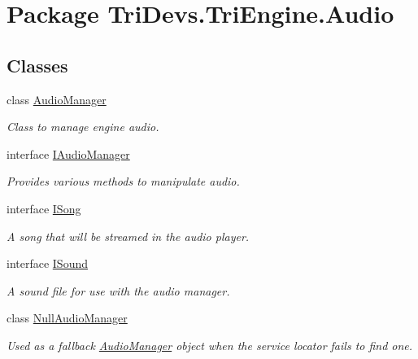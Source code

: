 \hypertarget{namespace_tri_devs_1_1_tri_engine_1_1_audio}{\section{Package Tri\-Devs.\-Tri\-Engine.\-Audio}
\label{namespace_tri_devs_1_1_tri_engine_1_1_audio}
}
\subsection*{Classes}
\begin{DoxyCompactItemize}
\item 
class \hyperlink{class_tri_devs_1_1_tri_engine_1_1_audio_1_1_audio_manager}{Audio\-Manager}
\begin{DoxyCompactList}\small\item\em Class to manage engine audio. \end{DoxyCompactList}\item 
interface \hyperlink{interface_tri_devs_1_1_tri_engine_1_1_audio_1_1_i_audio_manager}{I\-Audio\-Manager}
\begin{DoxyCompactList}\small\item\em Provides various methods to manipulate audio. \end{DoxyCompactList}\item 
interface \hyperlink{interface_tri_devs_1_1_tri_engine_1_1_audio_1_1_i_song}{I\-Song}
\begin{DoxyCompactList}\small\item\em A song that will be streamed in the audio player. \end{DoxyCompactList}\item 
interface \hyperlink{interface_tri_devs_1_1_tri_engine_1_1_audio_1_1_i_sound}{I\-Sound}
\begin{DoxyCompactList}\small\item\em A sound file for use with the audio manager. \end{DoxyCompactList}\item 
class \hyperlink{class_tri_devs_1_1_tri_engine_1_1_audio_1_1_null_audio_manager}{Null\-Audio\-Manager}
\begin{DoxyCompactList}\small\item\em Used as a fallback \hyperlink{class_tri_devs_1_1_tri_engine_1_1_audio_1_1_audio_manager}{Audio\-Manager} object when the service locator fails to find one. \end{DoxyCompactList}\item 

\end{DoxyCompactItemize}
